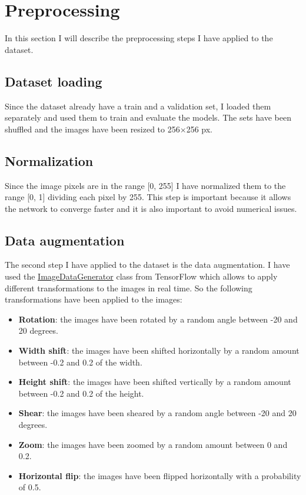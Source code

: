 \section{Preprocessing} \label{sec:preprocessing}
In this section I will describe the preprocessing steps I have applied to the dataset.

\subsection{Dataset loading} \label{sec:preprocessing-dataset-loading}
Since the dataset already have a train and a validation set, I loaded them separately and used them to train and evaluate the models.
The sets have been shuffled and the images have been resized to 256$\times$256 px.

\subsection{Normalization} \label{sec:preprocessing-normalization}
Since the image pixels are in the range [0, 255] I have normalized them to the range [0, 1] dividing each pixel by 255.
This step is important because it allows the network to converge faster and it is also important to avoid numerical issues.

\subsection{Data augmentation} \label{sec:preprocessing-data-augmentation}
The second step I have applied to the dataset is the data augmentation.
I have used the \href{https://www.tensorflow.org/api_docs/python/tf/keras/preprocessing/image/ImageDataGenerator}{ImageDataGenerator} class from TensorFlow which allows to apply different transformations to the images in real time.
So the following transformations have been applied to the images:
\begin{itemize}
    \item \textbf{Rotation}: the images have been rotated by a random angle between -20 and 20 degrees.
    \item \textbf{Width shift}: the images have been shifted horizontally by a random amount between -0.2 and 0.2 of the width.
    \item \textbf{Height shift}: the images have been shifted vertically by a random amount between -0.2 and 0.2 of the height.
    \item \textbf{Shear}: the images have been sheared by a random angle between -20 and 20 degrees.
    \item \textbf{Zoom}: the images have been zoomed by a random amount between 0 and 0.2.
    \item \textbf{Horizontal flip}: the images have been flipped horizontally with a probability of 0.5.
\end{itemize}

